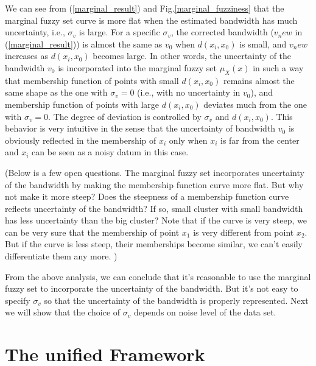 \documentclass[journal]{IEEEtran}
\begin{document}
We can see from (\ref{marginal_result}) and Fig.\ref{marginal_fuzziness} that 
the marginal fuzzy set curve is more flat when the estimated bandwidth has much uncertainty, i.e., $\sigma_v$ is large.
For a specific $\sigma_v$, the corrected bandwidth ($v_new$ in (\ref{marginal_result})) is almost the same as $v_0$ when $d(x_i,x_0)$ is small, and $v_new$ increases as $d(x_i,x_0)$ becomes large.
In other words, the uncertainty of the bandwidth $v_0$ is incorporated into the marginal fuzzy set $\mu_X(x)$ in such a way that membership function of points with small $d(x_i,x_0)$ remains almost the same shape as the one with $\sigma_v=0$ (i.e., with no uncertainty in $v_0$), and membership function of points with large $d(x_i,x_0)$ deviates much from the one with $\sigma_v=0$. The degree of deviation is controlled by $\sigma_v$ and $d(x_i,x_0)$. This behavior is very intuitive in the sense that the uncertainty of bandwidth $v_0$ is obviously reflected in the membership of $x_i$ only when $x_i$ is far from the center and $x_i$ can be seen as a noisy datum in this case. 

(Below is a few open questions. The marginal fuzzy set incorporates uncertainty of the bandwidth by making the membership function curve more flat.  But why not make it more steep? Does the steepness of a membership function curve reflects uncertainty of the bandwidth? If so, small cluster with small bandwidth has less uncertainty than the big cluster? Note that if the curve is very steep, we can be very sure that the membership of point $x_1$ is very different from point $x_2$. But if the curve is less steep, their memberships become similar, we can't easily differentiate them any more. )

From the above analysis, we can conclude that it's reasonable to use the marginal fuzzy set to incorporate the uncertainty of the bandwidth. But it's not easy to specify $\sigma_v$ so that the uncertainty of the bandwidth is properly represented. Next we will show that the choice of $\sigma_v$ depends on noise level of the data set.
\section{The unified Framework}
\label{sec-3}
\end{document}
